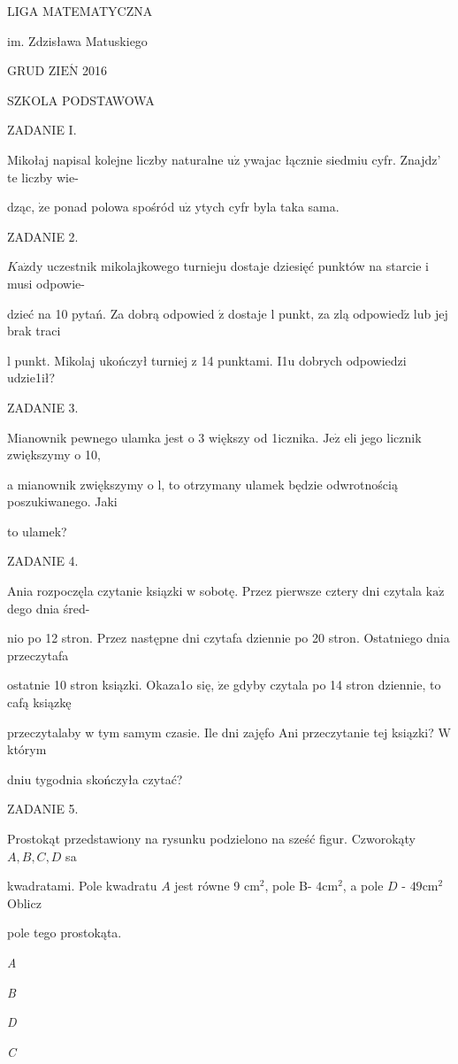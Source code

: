 \documentclass[a4paper,12pt]{article}
\begin{document}
LIGA MATEMATYCZNA

im. Zdzisława Matuskiego

GRUD Z$\mathrm{I}\mathrm{E}\acute{\mathrm{N}}$ 2016

SZKOLA PODSTAWOWA

ZADANIE I.

Mikołaj napisal kolejne liczby naturalne $\mathrm{u}\dot{\mathrm{z}}$ ywajac łącznie siedmiu cyfr. Znajdz' te liczby wie-

dząc, $\dot{\mathrm{z}}\mathrm{e}$ ponad polowa spośród $\mathrm{u}\dot{\mathrm{z}}$ ytych cyfr byla taka sama.

ZADANIE 2.

$K\mathrm{a}\dot{\mathrm{z}}\mathrm{d}\mathrm{y}$ uczestnik mikolajkowego turnieju dostaje dziesięć punktów na starcie i musi odpowie-

dzieć na 10 pytań. Za dobrą odpowied $\acute{\mathrm{z}}$ dostaje l punkt, za zlą $\mathrm{o}\mathrm{d}\mathrm{p}\mathrm{o}\mathrm{w}\mathrm{i}\mathrm{e}\mathrm{d}\acute{\mathrm{z}}$ lub jej brak traci

l punkt. Mikolaj ukończył turniej z 14 punktami. I1u dobrych odpowiedzi udzie1ił?

ZADANIE 3.

Mianownik pewnego ulamka jest o 3 większy od 1icznika. $\mathrm{J}\mathrm{e}\dot{\mathrm{z}}$ eli jego licznik zwiększymy o 10,

a mianownik zwiększymy o l, to otrzymany ulamek będzie odwrotnością poszukiwanego. Jaki

to ulamek?

ZADANIE 4.

Ania rozpoczęla czytanie ksiązki w sobotę. Przez pierwsze cztery dni czytala $\mathrm{k}\mathrm{a}\dot{\mathrm{z}}$ dego dnia śred-

nio po 12 stron. Przez następne dni czytafa dziennie po 20 stron. Ostatniego dnia przeczytafa

ostatnie 10 stron ksiązki. Okaza1o się, $\dot{\mathrm{z}}\mathrm{e}$ gdyby czytala po 14 stron dziennie, to cafą ksiązkę

przeczytalaby w tym samym czasie. Ile dni zajęfo Ani przeczytanie tej ksiązki? $\mathrm{W}$ którym

dniu tygodnia skończyła czytać?

ZADANIE 5.

Prostokąt przedstawiony na rysunku podzielono na sześć figur. Czworokąty $A, B, C, D$ sa

kwadratami. Pole kwadratu $A$ jest równe 9 $\mathrm{c}\mathrm{m}^{2}$, pole B- $4\mathrm{c}\mathrm{m}^{2}$, a pole $D$ - $49\mathrm{c}\mathrm{m}^{2}$ Oblicz

pole tego prostokąta.

{\it A}

{\it B}

{\it D}

{\it C}
\end{document}
